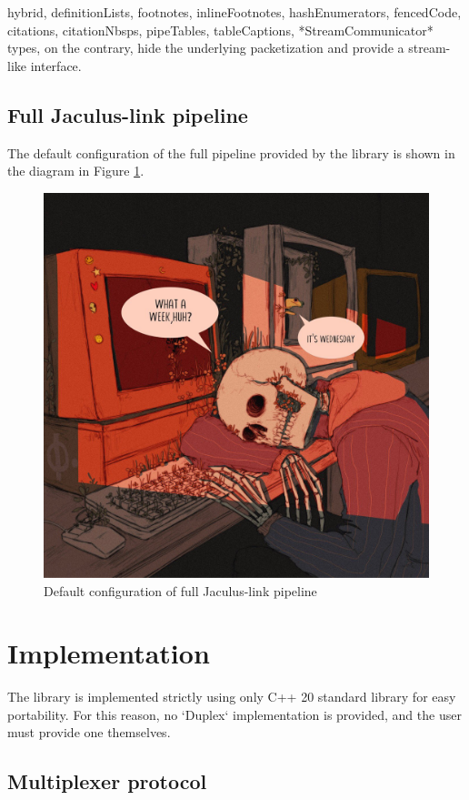 \documentclass[
  digital,
  oneside,
  nosansbold,
  nocolorbold,
  lof,
  lot
]{fithesis4}
\begin{document}
\begin{markdown*}{%
  hybrid,
  definitionLists,
  footnotes,
  inlineFootnotes,
  hashEnumerators,
  fencedCode,
  citations,
  citationNbsps,
  pipeTables,
  tableCaptions,
}
*StreamCommunicator* types, on the contrary, hide the underlying packetization and provide a stream-like interface.

\subsection{Full Jaculus-link pipeline}

The default configuration of the full pipeline provided by the library is shown in the diagram in Figure \ref{fig:link-pipeline}.

\begin{figure}[ht]
    \centering
    \includegraphics[width=\textwidth]{link-pipeline}
    \caption{Default configuration of full Jaculus-link pipeline}
    \label{fig:link-pipeline}
\end{figure}


\section{Implementation}

The library is implemented strictly using only C++ 20 standard library for easy portability. For this reason, no `Duplex` implementation is provided, and the user must provide one themselves.

\subsection{Multiplexer protocol}


\end{markdown*}
\end{document}
